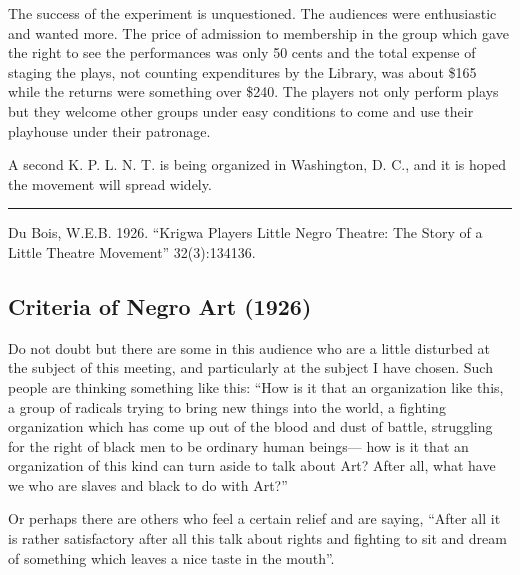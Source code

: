 \documentclass[letterpaper,10pt,english]{jupyterBook}
\begin{document}
\sphinxAtStartPar
{}
The success of the experiment is unquestioned. The audiences were enthusiastic and wanted more. The price of admission to membership in the group which gave the right to see the performances was only 50 cents and the total expense of staging the plays, not counting expenditures by the Library, was about \$165 while the returns were something over \$240. The players not only perform plays but they welcome other groups under easy conditions to come and use their playhouse under their patronage.

\sphinxAtStartPar
A second K. P. L. N. T. is being organized in Washington, D. C., and it is hoped the movement will spread widely.


\bigskip\hrule\bigskip


\sphinxAtStartPar
{} Du Bois, W.E.B. 1926. “Krigwa Players Little Negro Theatre: The Story of a Little Theatre Movement”  32(3):134\sphinxhyphen{}136.


\subsection{Criteria of Negro Art (1926)}
\label{\detokenize{Volumes/32/06/criteria_of_negro_art:criteria-of-negro-art-1926}}\label{\detokenize{Volumes/32/06/criteria_of_negro_art::doc}}
\sphinxAtStartPar
{}

\sphinxAtStartPar
Do not doubt but there are some in this audience who are a little disturbed at the subject of this meeting, and particularly at the subject I have chosen. Such people are thinking something like this: “How is it that an organization like this, a group of radicals trying to bring new things into the world, a fighting organization which has come up out of the blood and dust of battle, struggling for the right of black men to be ordinary human beings— how is it that an organization of this kind can turn aside to talk about Art? After all, what have we who are slaves and black to do with Art?”

\sphinxAtStartPar
Or perhaps there are others who feel a certain relief and are saying, “After all it is rather satisfactory after all this talk about rights and fighting to sit and dream of something which leaves a nice taste in the mouth”.
\end{document}
